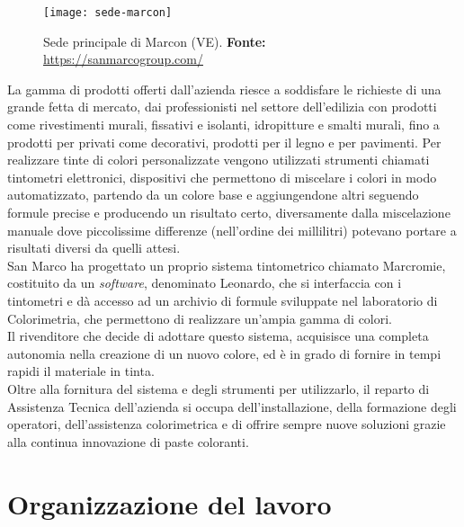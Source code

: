 \vspace{10pt}
\begin{figure}[htbp]
	\begin{center}
		\texttt{[image: sede-marcon]}
		\caption{Sede principale di Marcon (VE). \newline \textbf{Fonte: }\url{https://sanmarcogroup.com/}}
		\label{fig:sede-marcon}
	\end{center}
\end{figure}
\vspace{10pt}

La gamma di prodotti offerti dall'azienda riesce a soddisfare le richieste di una grande fetta di mercato, dai professionisti nel settore dell'edilizia con prodotti come rivestimenti murali, fissativi e isolanti, idropitture e smalti murali, fino a prodotti per privati come decorativi, prodotti per il legno e per pavimenti.
Per realizzare tinte di colori personalizzate vengono utilizzati strumenti chiamati tintometri elettronici, dispositivi che permettono di miscelare i colori in modo automatizzato, partendo da un colore base e aggiungendone altri seguendo formule precise e producendo un risultato certo, diversamente dalla miscelazione manuale dove piccolissime differenze (nell'ordine dei millilitri) potevano portare a risultati diversi da quelli attesi. \\
San Marco ha progettato un proprio sistema tintometrico chiamato Marcromie, costituito da un \textit{software}, denominato Leonardo, che si interfaccia con i tintometri e dà accesso ad un archivio di formule sviluppate nel laboratorio di Colorimetria, che permettono di realizzare un'ampia gamma di colori. \\
Il rivenditore che decide di adottare questo sistema, acquisisce una completa autonomia nella creazione di un nuovo colore, ed è in grado di fornire in tempi rapidi il materiale in tinta.\\
Oltre alla fornitura del sistema e degli strumenti per utilizzarlo, il reparto di Assistenza Tecnica dell'azienda si occupa dell'installazione, della formazione degli operatori, dell'assistenza colorimetrica e di offrire sempre nuove soluzioni grazie alla continua innovazione di paste coloranti. 


\section{Organizzazione del lavoro}

